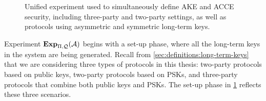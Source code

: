 \begin{figure}

\small


\caption{Unified experiment used to simultaneously define AKE and ACCE security,
including three-party and two-party settings, as well as protocols using asymmetric and symmetric long-term keys.}
\label{fig:generic_experiment}

\end{figure}


Experiment $\mathbf{Exp}_{\mathrm{\Pi},\mathcal{Q}}^{}(\mathcal{A})$ begins with a set-up phase,
where all the long-term keys in the system are being generated.
Recall from \cref{sec:definitions:long-term-keys} that we are considering three types of protocols in this thesis:
two-party protocols based on public keys,
two-party protocols based on PSKs,
and three-party protocols that combine both public keys and PSKs.
The set-up phase in \cref{fig:generic_experiment} reflects these three scenarios.

